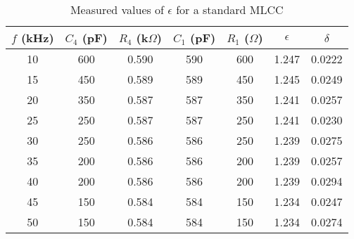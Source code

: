 \begin{table}[H]
    \centering
    \begin{tabular}{|c|c|c|c|c|c|c|}
    \hline
    $f$ (kHz) & $C_4$ (pF) & $R_4$ (k$\Omega$) & $C_1$ (pF) & $R_1$ ($\Omega$) & $\epsilon$ & $\delta$ \\ \hline
    10 & 600 & 0.590 & 590 & 600 & 1.247 & 0.0222 \\ \hline
    15 & 450 & 0.589 & 589 & 450 & 1.245 & 0.0249 \\ \hline
    20 & 350 & 0.587 & 587 & 350 & 1.241 & 0.0257 \\ \hline
    25 & 250 & 0.587 & 587 & 250 & 1.241 & 0.0230 \\ \hline
    30 & 250 & 0.586 & 586 & 250 & 1.239 & 0.0275 \\ \hline
    35 & 200 & 0.586 & 586 & 200 & 1.239 & 0.0257 \\ \hline
    40 & 200 & 0.586 & 586 & 200 & 1.239 & 0.0294 \\ \hline
    45 & 150 & 0.584 & 584 & 150 & 1.234 & 0.0247 \\ \hline
    50 & 150 & 0.584 & 584 & 150 & 1.234 & 0.0274 \\ \hline
    \end{tabular}
    \caption{Measured values of $\epsilon$ for a standard MLCC}
    \label{tab:b}
\end{table}